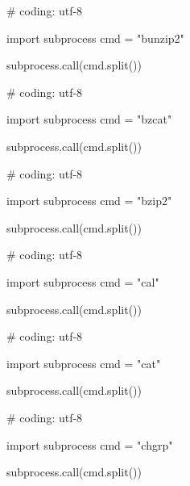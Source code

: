 \begin{mylisting}[label={lst:acpid},language=sh,caption=bunzip2]

# coding: utf-8

import subprocess
cmd = "bunzip2"

subprocess.call(cmd.split())

\end{mylisting}

\begin{mylisting}[label={lst:acpid},language=sh,caption=bzcat]

# coding: utf-8

import subprocess
cmd = "bzcat"

subprocess.call(cmd.split())

\end{mylisting}

\begin{mylisting}[label={lst:acpid},language=sh,caption=bzip2]

# coding: utf-8

import subprocess
cmd = "bzip2"

subprocess.call(cmd.split())

\end{mylisting}

\begin{mylisting}[label={lst:acpid},language=sh,caption=cal]

# coding: utf-8

import subprocess
cmd = "cal"

subprocess.call(cmd.split())

\end{mylisting}

\begin{mylisting}[label={lst:acpid},language=sh,caption=cat]

# coding: utf-8

import subprocess
cmd = "cat"

subprocess.call(cmd.split())

\end{mylisting}

\begin{mylisting}[label={lst:acpid},language=sh,caption=chgrp]

# coding: utf-8

import subprocess
cmd = "chgrp"

subprocess.call(cmd.split())

\end{mylisting}

